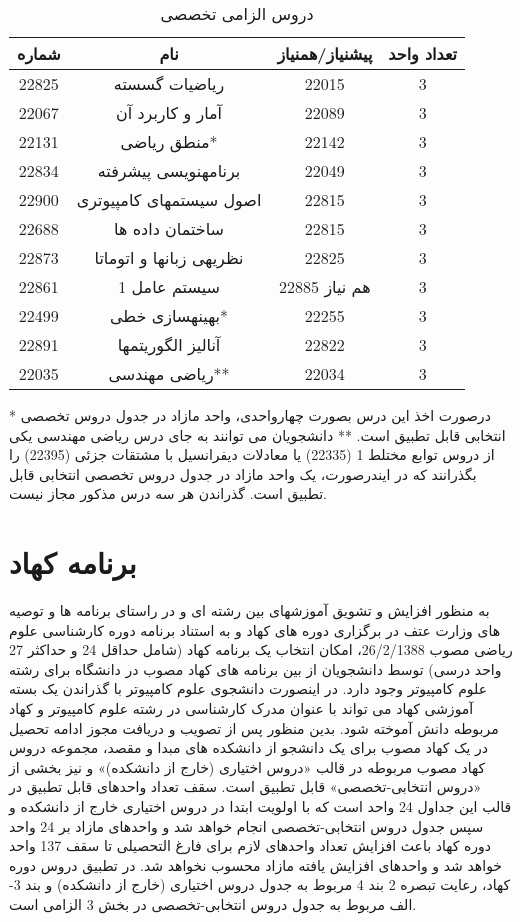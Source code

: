 \documentclass{article}
\begin{document}
\begin{table}[H]
\begin{center}
\begin{tabular}{|c|c|c|c|}
	\hline
	شماره & نام & پیشنیاز/همنیاز & تعداد واحد \\
	\hline
	22825 & ریاضیات گسسته &  22015 & 3 \\
	\hline
	22067 & آمار و کاربرد آن & 22089 & 3 \\
	\hline
	22131 & منطق ریاضی* & 22142 & 3 \\
	\hline
	22834 & برنامهنویسی پیشرفته & 22049 & 3 \\
	\hline
	22900 & اصول سیستمهای کامپیوتری & 22815 & 3 \\
	\hline
	22688 & ساختمان داده ها & 22815 & 3 \\
	\hline
	22873 & نظریهی زبانها و اتوماتا & 22825 & 3 \\
	\hline
	22861 & سیستم عامل 1 & 22885 هم نیاز & 3 \\
	\hline
	22499 & بهینهسازی خطی* & 22255 & 3 \\
	\hline
	22891 & آنالیز الگوریتمها & 22822 & 3 \\
	\hline
	22035 & ریاضی مهندسی** & 22034 & 3 \\
	\hline
\end{tabular}
\caption{\label{cs-t4}
دروس الزامی تخصصی
}
\end{center}
\end{table}
* درصورت اخذ این درس بصورت چهارواحدی، واحد مازاد در جدول دروس تخصصی انتخابی قابل تطبیق است.
** دانشجویان می توانند به جای درس ریاضی مهندسی یکی از دروس توابع مختلط 1 (22335) یا معادلات دیفرانسیل با مشتقات جزئی (22395) را بگذرانند که در ایندرصورت، یک واحد مازاد در جدول دروس تخصصی انتخابی قابل تطبیق است. گذراندن هر سه درس مذکور مجاز نیست. 

\section{برنامه کهاد}
\label{cskehad}
به منظور افزایش و تشویق آموزشهای بین رشته ای و در راستای برنامه ها و توصیه های وزارت عتف در برگزاری دوره های کهاد و به استناد برنامه دوره کارشناسی علوم ریاضی مصوب 26/2/1388، امکان انتخاب یک برنامه کهاد (شامل حداقل 24 و حداکثر 27 واحد درسی) توسط دانشجویان از بین برنامه های کهاد مصوب در دانشگاه برای رشته علوم کامپیوتر وجود دارد. در اینصورت دانشجوی علوم کامپیوتر با گذراندن یک بسته آموزشی کهاد می تواند با عنوان مدرک کارشناسی در رشته علوم کامپیوتر و کهاد مربوطه دانش آموخته شود. بدین منظور پس از تصویب و دریافت مجوز ادامه تحصیل در یک کهاد مصوب برای یک دانشجو از دانشکده های مبدا و مقصد، مجموعه دروس کهاد مصوب مربوطه در قالب «دروس اختیاری (خارج از دانشکده)» و نیز بخشی از «دروس انتخابی-تخصصی» قابل تطبیق است. سقف تعداد واحدهای قابل تطبیق در قالب این جداول 24 واحد است که با اولویت ابتدا در دروس اختیاری خارج از دانشکده و سپس جدول دروس انتخابی-تخصصی انجام خواهد شد و واحدهای مازاد بر 24 واحد دوره کهاد باعث افزایش تعداد واحدهای لازم برای فارغ التحصیلی تا سقف 137 واحد خواهد شد و واحدهای افزایش یافته مازاد محسوب نخواهد شد. در تطبیق دروس دوره کهاد، رعایت تبصره 2 بند 4 مربوط به جدول دروس اختیاری (خارج از دانشکده) و بند 3-الف مربوط به جدول دروس انتخابی-تخصصی در بخش 3 الزامی است. 
\end{document}
